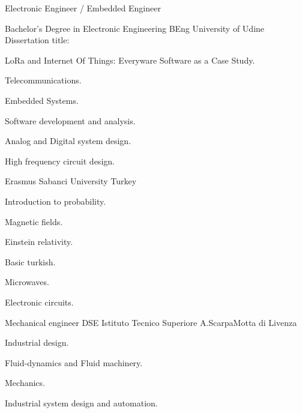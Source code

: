 \documentclass[english,a4paper]{europasscv}
\begin{document}
	\begin{europasscv}

	\ecvpersonalinfo
	 {
		Electronic Engineer / Embedded Engineer
	}



		 {
			Bachelor's Degree in Electronic Engineering
		}{BEng}
		\ecvitem{} {
			University of Udine
		}
		\ecvitem{} {
			\textcolor{ecvhighlightcolor}{Dissertation title}:
		}
		\begin{center} {
				LoRa and Internet Of Things: \linebreak
				Everyware Software as a Case Study.
		}
		\end{center}
		\ecvitem{} {
			\begin{ecvitemize}
				\item Telecommunications.
				\item Embedded Systems.
				\item Software development and analysis.
				\item Analog and Digital system design.
				\item High frequency circuit design.
			\end{ecvitemize}
		}

		 {
			Erasmus
		}
		\ecvitem{} {
			Sabanci University Turkey \newline
		}
		\ecvitem{} {
			\begin{ecvitemize}
				\item Introduction to probability.
				\item Magnetic fields.
				\item Einstein relativity.
				\item Basic turkish.
				\item Microwaves.
				\item Electronic circuits.
			\end{ecvitemize}
		}

		 {
			Mechanical engineer
		}{DSE}
		\ecvitem{} {
			Istituto Tecnico Superiore A.Scarpa\newline Motta di Livenza
		}
		\ecvitem{} {
			\begin{ecvitemize}
				\item Industrial design.
				\item Fluid-dynamics and Fluid machinery.
				\item Mechanics.
				\item Industrial system design and automation.
			\end{ecvitemize}
		}


\end{europasscv}
\end{document}
